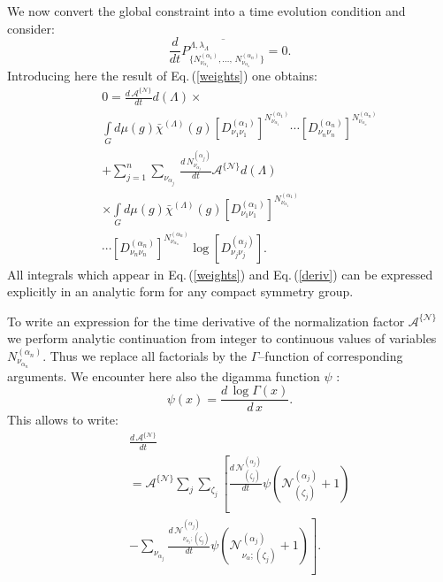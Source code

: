 \documentclass[a4paper]{article}
\begin{document}
We now convert the global constraint into a time evolution
condition and consider:
\begin{equation} \label{cond}
\frac{d}{dt}\overline{P^{\Lambda,\lambda_{\Lambda}}_{\{N^{(\alpha_1)}_{\nu_{\alpha_1}},
\dots,\,N^{(\alpha_n)}_{\nu_{\alpha_n}}\}}}=0 .
\end{equation}
Introducing  here the result of Eq.\,(\ref{weights}) one obtains:
\begin{eqnarray}
&&0 = \frac{d\,{\mathcal A}^{\{{\mathcal N}\}}}{dt}d(\Lambda)\times\nonumber\\[4pt]
&&\int\limits_G d\mu(g)\bar\chi^{(\Lambda)}(g)
[D^{(\alpha_1)}_{\nu_1\nu_1}]^{N^{(\alpha_1)}_{\nu_{\alpha_1}}}\cdots
[D^{(\alpha_n)}_{\nu_n\nu_n}]^{N^{(\alpha_n)}_{\nu_{\alpha_n}}}\nonumber\\[4pt]
&&+ \sum_{j=1}^n\sum_{\nu_{\alpha_j}}\,
\frac{d\,N^{(\alpha_j)}_{\nu_{\alpha_j}}}{dt} {\mathcal
A}^{\{{\mathcal N}\}}d(\Lambda)\nonumber\\[4pt]
&&\times \int\limits_G d\mu(g)\bar\chi^{(\Lambda)}(g)
[D^{(\alpha_1)}_{\nu_1\nu_1}]^{N^{(\alpha_1)}_{\nu_{\alpha_1}}}\nonumber\\[4pt]
 &&\cdots
[D^{(\alpha_n)}_{\nu_n\nu_n}]^{N^{(\alpha_n)}_{\nu_{\alpha_n}}}
\log[D^{(\alpha_j)}_{\nu_j\nu_j}] .
 \label{deriv}
\end{eqnarray}
All integrals which appear in Eq.\,(\ref{weights}) and
Eq.\,(\ref{deriv}) can be expressed explicitly in an analytic form
for any compact symmetry group.

To write an expression for the time derivative of the
normalization factor ${\mathcal A}^{\{{\mathcal N}\}}$ we perform
analytic continuation from integer to continuous values of
variables $N^{(\alpha_n)}_{\nu_{\alpha_n}}.$ Thus we replace all
factorials by the $\Gamma$--function  of corresponding arguments.
We encounter here also the digamma function $\psi$ \cite{Abram}:
\begin{equation}\label{digamma}
\psi(x)=\frac{d\, \log\Gamma(x)}{d\,x} .
\end{equation}
This allows to write:
\begin{eqnarray}
&&\frac{d\,{\mathcal A}^{\{{\mathcal N}\}}}{dt}\nonumber\\[4pt]
&& = {\mathcal A}^{\{{\mathcal N}\}}\sum_j\sum_{\zeta_j}
 \left[\frac{d\,{\mathcal N}^{(\alpha_j)}_{(\zeta_j)}}{dt}
 \psi({\mathcal N}^{(\alpha_j)}_{(\zeta_j)}+1)\right.\nonumber\\[4pt]
 &&-\left.\sum_{\nu_{\alpha_j}}
\frac{d\,{\mathcal N}^{(\alpha_j)}_{\nu_{\alpha_j};(\zeta_j)}}{dt}
\psi({\mathcal N}^{(\alpha_j)}_{\nu_\alpha;(\zeta_j)}+1)\right] .
\label{evfactor}
\end{eqnarray}
\end{document}
